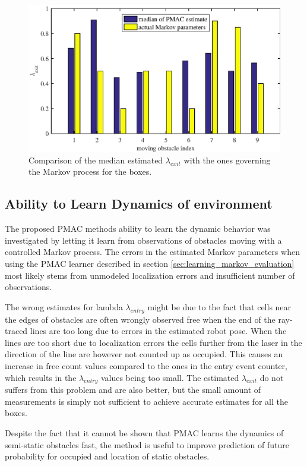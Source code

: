 \begin{figure}
    \centering
    \includegraphics[scale=1]{chapters/evaluation/figures/compare_learned_markov_exit}
    \caption{Comparison of the median estimated $\lambda_{exit}$ with the ones governing the Markov process for the boxes.}
    \label{fig:compare_learned_markov_exit}
\end{figure}

\subsection{Ability to Learn Dynamics of environment}
The proposed PMAC methods ability to learn the dynamic behavior was investigated by letting it learn from observations of obstacles moving with a controlled Markov process.
The errors in the estimated Markov parameters when using the PMAC learner described in section \ref{sec:learning_markov_evaluation} most likely stems from unmodeled localization errors and insufficient number of observations. 

The wrong estimates for lambda $\lambda_{entry}$ might be due to the fact that cells near the edges of obstacles are often wrongly observed free when the end of the ray-traced lines are too long due to errors in the estimated robot pose.
When the lines are too short due to localization errors the cells further from the laser in the direction of the line are however not counted up as occupied.
This causes an increase in free count values compared to the ones in the entry event counter, which results in the $\lambda_{entry}$ values being too small.
The estimated $\lambda_{exit}$ do not suffers from this problem and are also better, but the small amount of measurements is simply not sufficient to achieve accurate estimates for all the boxes.

Despite the fact that it cannot be shown that PMAC learns the dynamics of semi-static obstacles fast,
the method is useful to improve prediction of future probability for occupied and location of static obstacles.